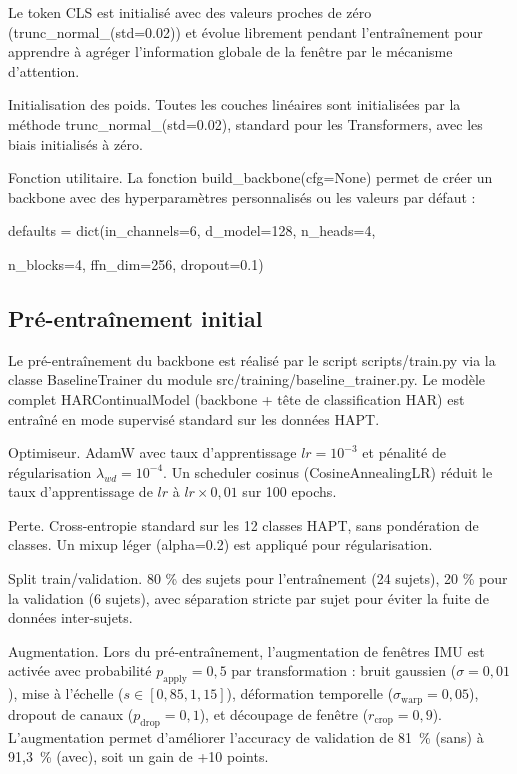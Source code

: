 \documentclass[a4paper,12pt]{report}
\begin{document}
Le token CLS est initialisé avec des valeurs proches de zéro (trunc\_normal\_(std=0.02)) et évolue librement pendant l'entraînement pour apprendre à agréger l'information globale de la fenêtre par le mécanisme d'attention.

Initialisation des poids. Toutes les couches linéaires sont initialisées par la méthode trunc\_normal\_(std=0.02), standard pour les Transformers, avec les biais initialisés à zéro.

Fonction utilitaire. La fonction build\_backbone(cfg=None) permet de créer un backbone avec des hyperparamètres personnalisés ou les valeurs par défaut :

defaults = dict(in\_channels=6, d\_model=128, n\_heads=4,

n\_blocks=4, ffn\_dim=256, dropout=0.1)

\subsection{Pré-entraînement initial}

Le pré-entraînement du backbone est réalisé par le script scripts/train.py via la classe BaselineTrainer du module src/training/baseline\_trainer.py. Le modèle complet HARContinualModel (backbone + tête de classification HAR) est entraîné en mode supervisé standard sur les données HAPT.

Optimiseur. AdamW avec taux d'apprentissage $lr = 10^{-3}$ et pénalité de régularisation $\lambda_{wd} = 10^{-4}$. Un scheduler cosinus (CosineAnnealingLR) réduit le taux d'apprentissage de $lr$ à $lr \times 0{,}01$ sur 100 epochs.

Perte. Cross-entropie standard sur les 12 classes HAPT, sans pondération de classes. Un mixup léger (alpha=0.2) est appliqué pour régularisation.

Split train/validation. 80 \% des sujets pour l'entraînement (24 sujets), 20 \% pour la validation (6 sujets), avec séparation stricte par sujet pour éviter la fuite de données inter-sujets.

Augmentation. Lors du pré-entraînement, l'augmentation de fenêtres IMU est activée avec probabilité $p_{\mathrm{apply}} = 0{,}5$ par transformation : bruit gaussien ($\sigma = 0{,}01$), mise à l'échelle ($s \in [0{,}85, 1{,}15]$), déformation temporelle ($\sigma_{\mathrm{warp}} = 0{,}05$), dropout de canaux ($p_{\mathrm{drop}} = 0{,}1$), et découpage de fenêtre ($r_{\mathrm{crop}} = 0{,}9$). L'augmentation permet d'améliorer l'accuracy de validation de 81~\% (sans) à 91,3~\% (avec), soit un gain de +10 points.
\end{document}
